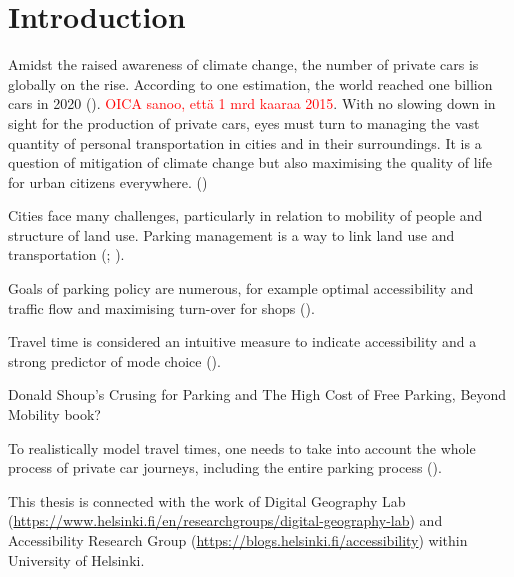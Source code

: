 \section{Introduction}
\justify


Amidst the raised awareness of climate change, the number of private cars is globally on the rise. According to one estimation, the world reached one billion cars in 2020 (\cite{Sperling2009}). \textcolor{red}{OICA sanoo, että 1 mrd kaaraa 2015}. With no slowing down in sight for the production of private cars, eyes must turn to managing the vast quantity of personal transportation in cities and in their surroundings. It is a question of mitigation of climate change but also maximising the quality of life for urban citizens everywhere. (\cite{StatisticsFinland2019})

Cities face many challenges, particularly in relation to mobility of people and structure of land use. Parking management is a way to link land use and transportation (\cite{Marsden2006}; \cite{Diallo2015}).

Goals of parking policy are numerous, for example optimal accessibility and traffic flow and maximising turn-over for shops (\cite{Marsden2006}).

Travel time is considered an intuitive measure to indicate accessibility and a strong predictor of mode choice (\cite{Frank2008}).

Donald Shoup's Crusing for Parking and The High Cost of Free Parking, Beyond Mobility book?

To realistically model travel times, one needs to take into account the whole process of private car journeys, including the entire parking process (\cite{Salonen2013}).

This thesis is connected with the work of Digital Geography Lab (\textcolor{blue}{\url{https://www.helsinki.fi/en/researchgroups/digital-geography-lab}}) and Accessibility Research Group (\textcolor{blue}{\url{https://blogs.helsinki.fi/accessibility}}) within University of Helsinki.

